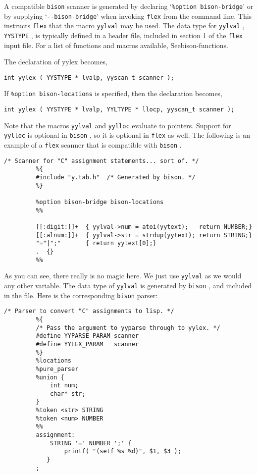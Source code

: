 \documentclass[openany,oneside]{book}
\begin{document}
A compatible \verb`bison` scanner is generated by declaring ‘\verb`%option bison-bridge`’ or by supplying ‘\verb`--bison-bridge`’ when invoking \verb`flex` from the command line.  This instructs \verb`flex` that the macro \verb`yylval` may be used. The data type for \verb`yylval` , \verb`YYSTYPE` ,
is typically defined in a header file, included in section 1 of the \verb`flex` input file.  For a list of functions and macros
available, Seebison-functions.

The declaration of yylex becomes,


\begin{verbatim}
int yylex ( YYSTYPE * lvalp, yyscan_t scanner );
\end{verbatim}


If \verb`%option bison-locations` is specified, then the declaration
becomes,


\begin{verbatim}
int yylex ( YYSTYPE * lvalp, YYLTYPE * llocp, yyscan_t scanner );
\end{verbatim}


Note that the macros \verb`yylval` and \verb`yylloc` evaluate to pointers. 
Support for \verb`yylloc` is optional in \verb`bison` , so it is optional in \verb`flex` as well. The following is an example of a \verb`flex` scanner that
is compatible with \verb`bison` .


\begin{verbatim}
/* Scanner for "C" assignment statements... sort of. */
         %{
         #include "y.tab.h"  /* Generated by bison. */
         %}
     
         %option bison-bridge bison-locations
         %%
     
         [[:digit:]]+  { yylval->num = atoi(yytext);   return NUMBER;}
         [[:alnum:]]+  { yylval->str = strdup(yytext); return STRING;}
         "="|";"       { return yytext[0];}
         .  {}
         %%
\end{verbatim}


As you can see, there really is no magic here. We just use \verb`yylval` as we would any other variable. The data type of \verb`yylval` is generated by \verb`bison` , and included in the file. Here is the corresponding \verb`bison` parser:


\begin{verbatim}
/* Parser to convert "C" assignments to lisp. */
         %{
         /* Pass the argument to yyparse through to yylex. */
         #define YYPARSE_PARAM scanner
         #define YYLEX_PARAM   scanner
         %}
         %locations
         %pure_parser
         %union {
             int num;
             char* str;
         }
         %token <str> STRING
         %token <num> NUMBER
         %%
         assignment:
             STRING '=' NUMBER ';' {
                 printf( "(setf %s %d)", $1, $3 );
            }
         ;
\end{verbatim}
\end{document}

